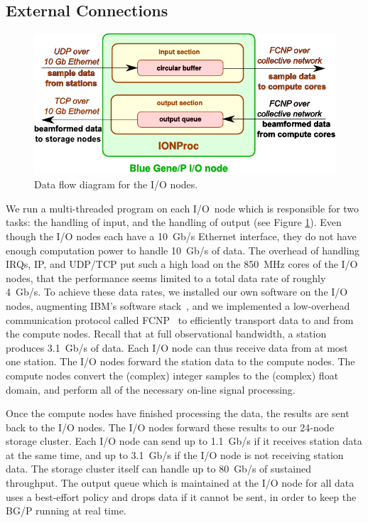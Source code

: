 \documentclass{llncs}
\begin{document}
\subsection{External Connections}

\begin{figure}[ht]
\includegraphics[width=\textwidth]{ION-processing.pdf}
\caption{Data flow diagram for the I/O nodes.}
\label{fig:ion-processing}
\end{figure}

We run a multi-threaded program on each I/O~node which is responsible for two tasks: the handling of input, and the handling of output (see Figure \ref{fig:ion-processing}). Even though the I/O nodes each have a 10~Gb/s Ethernet interface, they do not have enough computation power to handle 10~Gb/s of data. The overhead of handling IRQs, IP, and UDP/TCP put such a high load on the 850~MHz cores of the I/O nodes, that the performance seems limited to a total data rate of roughly 4~Gb/s. To achieve these data rates, we installed our own software on the I/O nodes, augmenting IBM's software stack~\cite{Yoshii:10}, and we implemented a low-overhead communication protocol called FCNP~\cite{Romein:09a} to efficiently transport data to and from the compute nodes. Recall that at full observational bandwidth, a station produces 3.1~Gb/s of data. Each I/O node can thus receive data from at most one station. The I/O nodes forward the station data to the compute nodes. The compute nodes convert the (complex) integer samples to the (complex) float domain, and perform all of the necessary on-line signal processing.

Once the compute nodes have finished processing the data, the results are sent back to the I/O nodes. The I/O nodes forward these results to our 24-node storage cluster. Each I/O node can send up to 1.1~Gb/s if it receives station data at the same time, and up to 3.1~Gb/s if the I/O node is not receiving station data. The storage cluster itself can handle up to 80~Gb/s of sustained throughput. The output queue which is maintained at the I/O node for all data uses a best-effort policy and drops data if it cannot be sent, in order to keep the BG/P running at real time.
\end{document}
